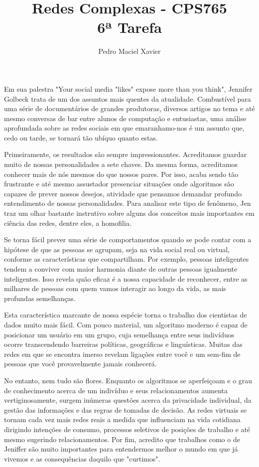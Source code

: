 \documentclass{homework}
\title{Redes Complexas - CPS765 \\[1ex]%
	6ª Tarefa}
\author{Pedro Maciel Xavier}
\begin{document}
	\smaketitle %
	
	Em sua palestra "Your social media "likes" expose more than you think",  Jennifer Golbeck trata de um dos assuntos mais quentes da atualidade. Combustível para uma série de documentários de grandes produtoras, diversos artigos no tema e até mesmo conversas de bar entre alunos de computação e entusiastas, uma análise aprofundada sobre as redes sociais em que emaranhamo-nos é um assunto que, cedo ou tarde, se tornará tão ubíquo quanto estas.\par
	
	Primeiramente, os resultados são sempre impressionantes. Acreditamos guardar muito de nossas personalidades a sete chaves. Da mesma forma, acreditamos conhecer mais de nós mesmos do que nossos pares. Por isso, acaba sendo tão frustrante e até mesmo assustador presenciar situações onde algoritmos são capazes de prever nossos desejos, atividade que pensamos demandar profundo entendimento de nossas personalidades. Para analisar este tipo de fenômeno, Jen traz um olhar bastante instrutivo sobre alguns dos conceitos mais importantes em ciência das redes, dentre eles, a homofilia.\par
	
	Se torna fácil prever uma série de comportamentos quando se pode contar com a hipótese de que as pessoas se agrupam, seja na vida social real ou virtual, conforme as características que compartilham. Por exemplo, pessoas inteligentes tendem a conviver com maior harmonia diante de outras pessoas igualmente inteligentes. Isso revela quão eficaz é a nossa capacidade de reconhecer, entre as milhares de pessoas com quem vamos interagir ao longo da vida, as mais profundas semelhanças.\par
	
	Esta característica marcante de nossa espécie torna o trabalho dos cientistas de dados muito mais fácil. Com pouco material, um algoritmo moderno é capaz de posicionar um usuário em um grupo, cuja semelhança entre seus indivíduos ocorre transcendendo barreiras políticas, geográficas e linguísticas. Muitas das redes em que se encontra imerso revelam ligações entre você e um sem-fim de pessoas que você provavelmente jamais conhecerá.\par
	
	No entanto, nem tudo são flores. Enquanto os algoritmos se aperfeiçoam e o grau de conhecimento acerca de um indivíduo e seus relacionamentos aumenta vertiginosamente, surgem inúmeras questões acerca da privacidade individual, da gestão das informações e das regras de tomadas de decisão. As redes virtuais se tornam cada vez mais redes reais a medida que influenciam na vida cotidiana dirigindo intenções de consumo, processos seletivos de posições de trabalho e até mesmo sugerindo relacionamentos. Por fim, acredito que trabalhos como o de Jeniffer são muito importantes para entendermos melhor o mundo em que já vivemos e as consequências daquilo que "curtimos".\par
\end{document}
